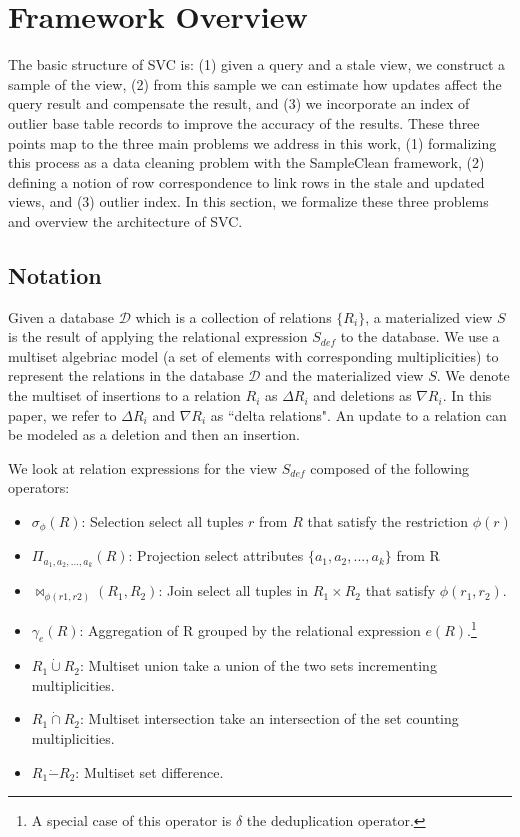 \section{Framework Overview}\label{sec-arch}
The basic structure of SVC is: (1) given a query and a stale view, we construct a sample of the view, (2) from this sample we can estimate how updates affect the query result and compensate the result, and (3) we incorporate an index of outlier base table records to improve the accuracy of the results.
These three points map to the three main problems we address in this work, (1) formalizing this process as a data cleaning problem with the SampleClean framework, (2) defining a notion of row correspondence to link rows in the stale and updated views, and (3) outlier index.
In this section, we formalize these three problems and overview the architecture of SVC.

\subsection{Notation}
Given a database $\mathcal{D}$ which is a collection of relations $\{R_i\}$, a materialized view $S$ is the result of applying the relational expression $S_{def}$ to the database.
We use a multiset algebriac model (a set of elements with corresponding multiplicities) to represent the relations in the database $\mathcal{D}$ and the materialized view $S$.
We denote the multiset of insertions to a relation $R_i$ as $\Delta R_i$ and deletions as $\nabla R_i$.
In this paper, we refer to $\Delta R_i$ and $\nabla R_i$ as ``delta relations".
An update to a relation can be modeled as a deletion and then an insertion.

We look at relation expressions for the view $S_{def}$ composed of the following operators:
\begin{itemize}\vspace{-.45em}
\item $\sigma_{\phi}(R)$: Selection select all tuples $r$ from $R$ that satisfy the restriction $\phi (r)$ \vspace{-.45em}
\item $\Pi_{a_1,a_2,...,a_k}(R)$: Projection select attributes $\{a_1,a_2,...,a_k\}$ from R \vspace{-.45em}
\item $\bowtie_{\phi (r1,r2)}(R_1,R_2)$: Join select all tuples in $R_1 \times R_2$ that satisfy $\phi (r_1,r_2)$.
\item $\gamma_{e}(R)$: Aggregation of R grouped by the relational expression $e(R)$.\footnote{A special case of this operator is $\delta$ the deduplication operator.}\vspace{-.45em}
\item $R_1 \dot{\cup} R_2$: Multiset union take a union of the two sets incrementing multiplicities.
\item $R_1 \dot{\cap} R_2$: Multiset intersection take an intersection of the set counting multiplicities.
\item $R_1 \dot{-} R_2$: Multiset set difference.
\end{itemize}

